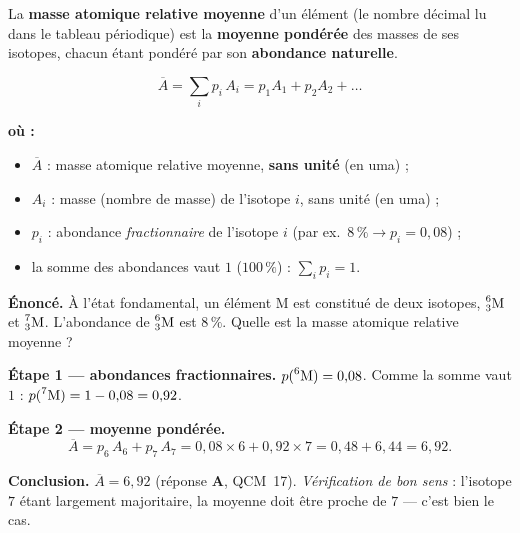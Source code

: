 \documentclass[11pt,a4paper]{article}
\newenvironment{ou}{%
  \par\smallskip\noindent\textbf{où :}\nopagebreak
  \begin{itemize}[leftmargin=1.8em,topsep=2pt,itemsep=1.5pt,parsep=0pt]}%
  {\end{itemize}}
\newcommand{\nuc}[3]{\prescript{#1}{#2}{\mathrm{#3}}}  %
\begin{document}
\begin{definition}
La \textbf{masse atomique relative moyenne} d'un élément (le nombre décimal lu dans le tableau
périodique) est la \textbf{moyenne pondérée} des masses de ses isotopes, chacun étant pondéré par son
\textbf{abondance naturelle}.
\end{definition}

\begin{formule}
\[ \boxed{\ \overline{A} = \sum_i p_i\, A_i = p_1 A_1 + p_2 A_2 + \dots\ } \]
\begin{ou}
  \item $\overline{A}$ : masse atomique relative moyenne, \textbf{sans unité} (en uma) ;
  \item $A_i$ : masse (nombre de masse) de l'isotope $i$, sans unité (en uma) ;
  \item $p_i$ : abondance \emph{fractionnaire} de l'isotope $i$ (par ex.\ $8\,\% \to p_i = 0{,}08$) ;
  \item la somme des abondances vaut $1$ ($100\,\%$) : $\sum_i p_i = 1$.
\end{ou}
\end{formule}

\begin{exemple}
\textbf{Énoncé.} À l'état fondamental, un élément $\mathrm{M}$ est constitué de deux isotopes,
$\nuc{6}{3}{M}$ et $\nuc{7}{3}{M}$. L'abondance de $\nuc{6}{3}{M}$ est $8\,\%$. Quelle est la masse
atomique relative moyenne ?

\smallskip
\textbf{Étape 1 — abondances fractionnaires.} $p(\nuc{6}{}{M}) = 0{,}08$. Comme la somme vaut $1$ :
$p(\nuc{7}{}{M}) = 1 - 0{,}08 = 0{,}92$.

\textbf{Étape 2 — moyenne pondérée.}
\[ \overline{A} = p_6\,A_6 + p_7\,A_7 = 0{,}08 \times 6 + 0{,}92 \times 7 = 0{,}48 + 6{,}44 = 6{,}92. \]

\textbf{Conclusion.} $\overline{A} = 6{,}92$ (réponse \textbf{A}, QCM~17). \emph{Vérification de bon sens} :
l'isotope $7$ étant largement majoritaire, la moyenne doit être proche de $7$ — c'est bien le cas.
\end{exemple}
\end{document}
